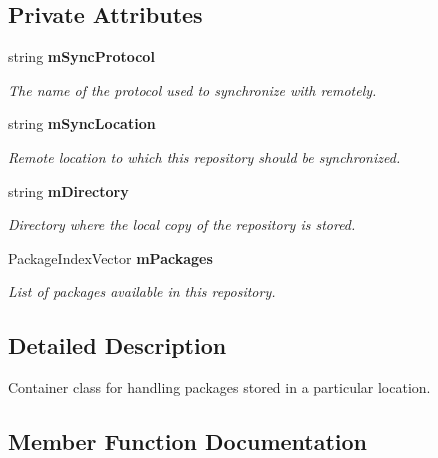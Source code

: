 \subsection*{Private Attributes}
\begin{DoxyCompactItemize}
\item 
string {\bf mSyncProtocol}\label{classRepository_ab79bad19064e104865e1d03d4b26bb24}

\begin{DoxyCompactList}\small\item\em The name of the protocol used to synchronize with remotely. \item\end{DoxyCompactList}\item 
string {\bf mSyncLocation}\label{classRepository_af0035425690eb556636ae0e446088351}

\begin{DoxyCompactList}\small\item\em Remote location to which this repository should be synchronized. \item\end{DoxyCompactList}\item 
string {\bf mDirectory}\label{classRepository_a7b05273da22bb5c3d932af363cff37c4}

\begin{DoxyCompactList}\small\item\em Directory where the local copy of the repository is stored. \item\end{DoxyCompactList}\item 
PackageIndexVector {\bf mPackages}\label{classRepository_adb6bca12015378f76eceadfc65997b25}

\begin{DoxyCompactList}\small\item\em List of packages available in this repository. \item\end{DoxyCompactList}\end{DoxyCompactItemize}


\subsection{Detailed Description}
Container class for handling packages stored in a particular location. 

\subsection{Member Function Documentation}
